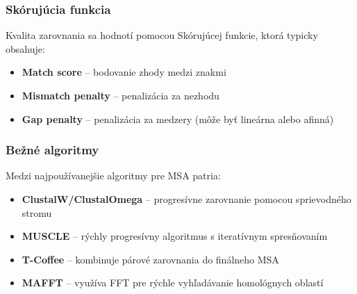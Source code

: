 \subsubsection{Skórujúcia funkcia}
Kvalita zarovnania sa hodnotí pomocou Skórujúcej funkcie, ktorá typicky obsahuje:

\begin{itemize}
    \item \textbf{Match score} -- bodovanie zhody medzi znakmi
    \item \textbf{Mismatch penalty} -- penalizácia za nezhodu
    \item \textbf{Gap penalty} -- penalizácia za medzery (môže byť lineárna alebo afinná)
\end{itemize}

\subsubsection{Bežné algoritmy}
Medzi najpoužívanejšie algoritmy pre MSA patria:

\begin{itemize}
    \item \textbf{ClustalW/ClustalOmega} -- progresívne zarovnanie pomocou sprievodného stromu
    \item \textbf{MUSCLE} -- rýchly progresívny algoritmus s iteratívnym spresňovaním
    \item \textbf{T-Coffee} -- kombinuje párové zarovnania do finálneho MSA
    \item \textbf{MAFFT} -- využíva FFT pre rýchle vyhľadávanie homológnych oblastí
\end{itemize}
